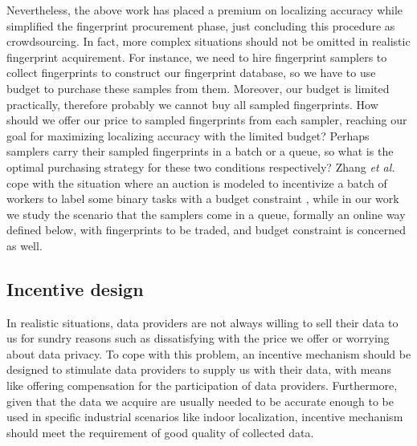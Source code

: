 \documentclass[10pt,conference,compsocconf,letterpaper]{IEEEtran}
\begin{document}
Nevertheless, the above work has placed a premium on localizing accuracy while simplified the fingerprint procurement phase, just concluding this procedure as crowdsourcing. In fact, more complex situations should not be omitted in realistic fingerprint acquirement. For instance, we need to hire fingerprint samplers to collect fingerprints to construct our fingerprint database, so we have to use budget to purchase these samples from them. Moreover, our budget is limited practically, therefore probably we cannot buy all sampled fingerprints. How should we offer our price to sampled fingerprints from each sampler, reaching our goal for maximizing localizing accuracy with the limited budget? Perhaps samplers carry their sampled fingerprints in a batch or a queue, so what is the optimal purchasing strategy for these two conditions respectively? Zhang \emph{et al.} cope with the situation where an auction is modeled to incentivize a batch of workers to label some binary tasks with a budget constraint \cite{zhang2015incentivize}, while in our work we study the scenario that the samplers come in a queue, formally an online way defined below, with fingerprints to be traded, and budget constraint is concerned as well.

\subsection{Incentive design}

In realistic situations, data providers are not always willing to sell their data to us for sundry reasons such as dissatisfying with the price we offer %
or worrying about data privacy. To cope with this problem, an incentive mechanism should be designed to stimulate data providers to supply us with their data, with means like offering compensation for the participation of data providers. Furthermore, given that the data we acquire are usually needed to be accurate enough to be used in specific industrial scenarios like indoor localization, incentive mechanism should meet the requirement of good quality of collected data. %
\end{document}
